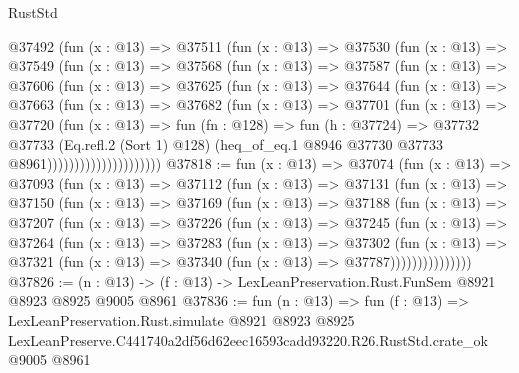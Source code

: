 \begin{lexlean}{RustStd}
\begin{coremodule}
                @37492
                  (fun (x : @13) =>
                  @37511
                    (fun (x : @13) =>
                    @37530
                      (fun (x : @13) =>
                      @37549
                        (fun (x : @13) =>
                        @37568
                          (fun (x : @13) =>
                          @37587
                            (fun (x : @13) =>
                            @37606
                              (fun (x : @13) =>
                              @37625
                                (fun (x : @13) =>
                                @37644
                                  (fun (x : @13) =>
                                  @37663
                                    (fun (x : @13) =>
                                    @37682
                                      (fun (x : @13) =>
                                      @37701
                                        (fun (x : @13) =>
                                        @37720
                                          (fun (x : @13) =>
                                          fun (fn : @128) =>
                                          fun (h : @37724) =>
                                          @37732
                                            @37733
                                            (Eq.refl.{2} (Sort 1) @128)
                                            (heq_of_eq.{1}
                                              @8946
                                              @37730
                                              @37733
                                              @8961)))))))))))))))))))))
@37818 := fun (x : @13) =>
  @37074
    (fun (x : @13) =>
    @37093
      (fun (x : @13) =>
      @37112
        (fun (x : @13) =>
        @37131
          (fun (x : @13) =>
          @37150
            (fun (x : @13) =>
            @37169
              (fun (x : @13) =>
              @37188
                (fun (x : @13) =>
                @37207
                  (fun (x : @13) =>
                  @37226
                    (fun (x : @13) =>
                    @37245
                      (fun (x : @13) =>
                      @37264
                        (fun (x : @13) =>
                        @37283
                          (fun (x : @13) =>
                          @37302
                            (fun (x : @13) =>
                            @37321 (fun (x : @13) => @37340 (fun (x : @13) => @37787)))))))))))))))
@37826 := (n : @13) -> (f : @13) -> LexLeanPreservation.Rust.FunSem @8921 @8923 @8925 @9005 @8961
@37836 := fun (n : @13) =>
  fun (f : @13) =>
  LexLeanPreservation.Rust.simulate
    @8921
    @8923
    @8925
    LexLeanPreserve.C441740a2df56d62eec16593cadd93220.R26.RustStd.crate_ok
    @9005
    @8961
\end{coremodule}
\end{lexlean}
